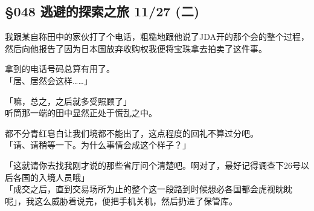 \subsection{§048 逃避的探索之旅 11/27 (二)}

我跟某自称田中的家伙打了个电话，粗糙地跟他说了JDA开的那个会的整个过程，然后向他报告了因为日本国放弃收购权我便将宝珠拿去拍卖了这件事。

拿到的电话号码总算有用了。\\

「居、居然会这样……」

「嘛，总之，之后就多受照顾了」\\

听筒那一端的田中显然正处于慌乱之中。

都不分青红皂白让我们境都不能出了，这点程度的回礼不算过分吧。\\

「请、请稍等一下。为什么事情会成这个样子？」

「这就请你去找我刚才说的那些省厅问个清楚吧。啊对了，最好记得调查下26号以后各国的入境人员哦」\\

「成交之后，直到交易场所为止的整个这一段路到时候想必各国都会虎视眈眈呢」，我这么威胁着说完，便把手机关机，然后扔进了保管库。\\

\sqsplit\\

